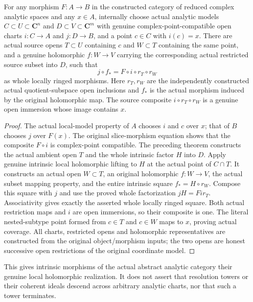 \begin{theorem}
\label{hir:reduced-analytic-morphism-actual-holomorphic-charts}
\leanok
For any morphism $F:A\to B$ in the constructed category of reduced complex
analytic spaces and any $x\in A$, internally choose actual analytic
models $C\subset U\subset\mathbf C^n$ and $D\subset V\subset\mathbf C^m$
with genuine complex-point-compatible open charts $i:C\to A$ and
$j:D\to B$, and a point $c\in C$ with $i(c)=x$. There are actual source
opens $T\subset U$ containing $c$ and $W\subset T$ containing the same
point, and a genuine holomorphic $f:W\to V$ carrying the corresponding
actual restricted source subset into $D$, such that
\[
  j\circ f_* = F\circ i\circ r_T\circ r_W
\]
as whole locally ringed morphisms. Here $r_T,r_W$ are the independently
constructed actual quotient-subspace open inclusions and $f_*$ is the
actual morphism induced by the original holomorphic map. The source
composite $i\circ r_T\circ r_W$ is a genuine open immersion whose image
contains $x$.
\end{theorem}
\begin{proof}
The actual local-model property of $A$ chooses $i$ and $c$ over $x$;
that of $B$ chooses $j$ over $F(x)$. The original slice-morphism equation
shows that the composite $F\circ i$ is complex-point compatible. The
preceding theorem constructs the actual ambient open $T$ and the whole
intrinsic factor $H$ into $D$. Apply genuine intrinsic local holomorphic
lifting to $H$ at the actual point of $C\cap T$. It constructs an actual
open $W\subset T$, an original holomorphic $f:W\to V$, the actual subset
mapping property, and the entire intrinsic square
$f_*=H\circ r_W$. Compose this square with $j$ and use the proved whole
factorization $jH=F i r_T$. Associativity gives exactly the asserted
whole locally ringed square. Both actual restriction maps and $i$ are
open immersions, so their composite is one. The literal nested-subtype
point formed from $c\in T$ and $c\in W$ maps to $x$, proving actual
coverage. All charts, restricted opens and holomorphic representatives
are constructed from the original object/morphism inputs; the two opens
are honest successive open restrictions of the original coordinate model.
\end{proof}

This gives intrinsic morphisms of the actual abstract analytic category
their genuine local holomorphic realization. It does not assert that
resolution towers or their coherent ideals descend across arbitrary
analytic charts, nor that such a tower terminates.
